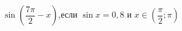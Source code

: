 \begin{ex}[type=calculate_expression]
	\begin{condition}
		\( \sin\left( \dfrac{7\pi}{2}-x \right) \),\quad если \( \sin x = 0,8 \) и \( x\in\left( \dfrac{\pi}{2};\pi \right) \)
	\end{condition}
\end{ex}